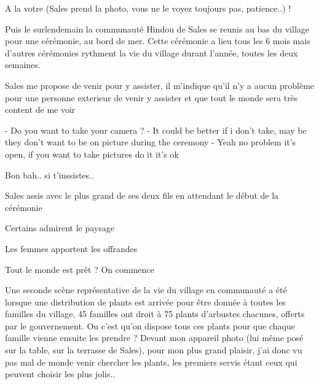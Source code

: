 \begin{multicols}{2}
A la votre (Sales prend la photo, vous ne le voyez toujours pas, patience..) !

Puis le surlendemain la communauté Hindou de Sales se reunis au bas du village pour une cérémonie, au bord de mer. Cette cérémonie a lieu tous les 6 mois mais d'autres cérémonies rythment la vie du village durant l'année, toutes les deux semaines.

Sales me propose de venir pour y assister, il m'indique qu'il n'y a aucun problème pour une personne exterieur de venir y assister et que tout le monde sera très content de me voir

- Do you want to take your camera ?
- It could be better if i don't take, may be they don't want to be on picture during the ceremony
- Yeah no problem it's open, if you want to take pictures do it it's ok

Bon bah.. si t'inssistes..

Sales assis avec le plus grand de ses deux fils en attendant le début de la cérémonie


Certains admirent le paysage


Les femmes apportent les offrandes



Tout le monde est prêt ? On commence



Une seconde scène représentative de la vie du village en communauté a été lorsque une distribution de plants est arrivée pour être donnée à toutes les familles du village, 45 familles ont droit à 75 plants d'arbustes chacunes, offerts par le gouvernement. Ou c'est qu'on dispose tous ces plants pour que chaque famille vienne ensuite les prendre ? Devant mon appareil photo (lui même posé sur la table, sur la terrasse de Sales), pour mon plus grand plaisir, j'ai donc vu pas mal de monde venir chercher les plants, les premiers servis étant ceux qui peuvent choisir les plus jolis..


\end{multicols}
